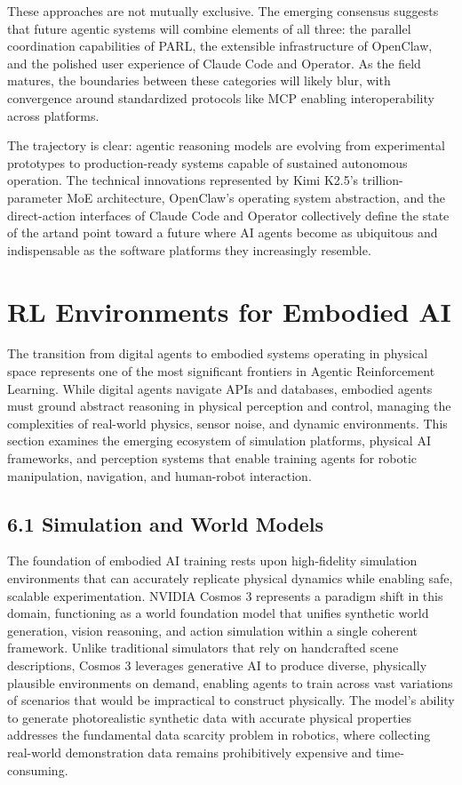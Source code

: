 These approaches are not mutually exclusive. The emerging consensus suggests that future agentic systems will combine elements of all three: the parallel coordination capabilities of PARL, the extensible infrastructure of OpenClaw, and the polished user experience of Claude Code and Operator. As the field matures, the boundaries between these categories will likely blur, with convergence around standardized protocols like MCP enabling interoperability across platforms.

The trajectory is clear: agentic reasoning models are evolving from experimental prototypes to production-ready systems capable of sustained autonomous operation. The technical innovations represented by Kimi K2.5's trillion-parameter MoE architecture, OpenClaw's operating system abstraction, and the direct-action interfaces of Claude Code and Operator collectively define the state of the artand point toward a future where AI agents become as ubiquitous and indispensable as the software platforms they increasingly resemble.
\section{ RL Environments for Embodied AI}

The transition from digital agents to embodied systems operating in physical space represents one of the most significant frontiers in Agentic Reinforcement Learning. While digital agents navigate APIs and databases, embodied agents must ground abstract reasoning in physical perception and control, managing the complexities of real-world physics, sensor noise, and dynamic environments. This section examines the emerging ecosystem of simulation platforms, physical AI frameworks, and perception systems that enable training agents for robotic manipulation, navigation, and human-robot interaction.

\subsection{6.1 Simulation and World Models}

The foundation of embodied AI training rests upon high-fidelity simulation environments that can accurately replicate physical dynamics while enabling safe, scalable experimentation. NVIDIA Cosmos 3 represents a paradigm shift in this domain, functioning as a world foundation model that unifies synthetic world generation, vision reasoning, and action simulation within a single coherent framework. Unlike traditional simulators that rely on handcrafted scene descriptions, Cosmos 3 leverages generative AI to produce diverse, physically plausible environments on demand, enabling agents to train across vast variations of scenarios that would be impractical to construct physically. The model's ability to generate photorealistic synthetic data with accurate physical properties addresses the fundamental data scarcity problem in robotics, where collecting real-world demonstration data remains prohibitively expensive and time-consuming.

